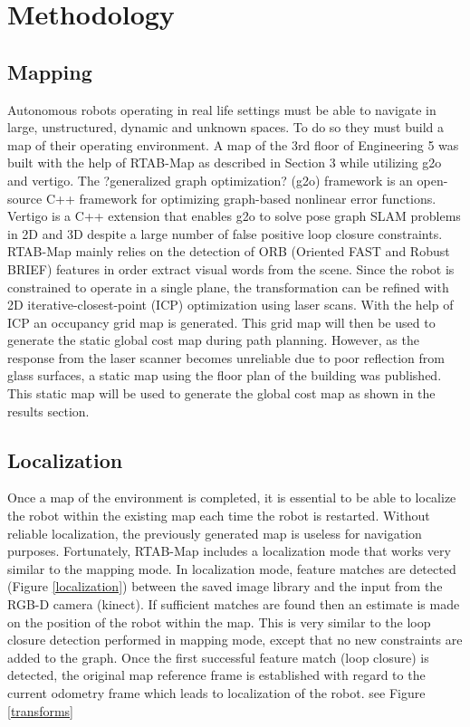 \documentclass[letterpaper, 10 pt, conference]{ieeeconf}  %
\begin{document}
\section{Methodology}

\subsection{Mapping}

Autonomous robots operating in real life settings must be able to navigate in large, unstructured, dynamic and unknown spaces. To do so they must build a map of their operating environment. A map of the 3rd floor of Engineering 5 was built with the help of RTAB-Map as described in Section 3 while utilizing g2o and vertigo. The ?generalized graph optimization? (g2o) framework is an open-source C++ framework for optimizing graph-based nonlinear error functions. Vertigo is a C++ extension that enables g2o to solve pose graph SLAM problems in 2D and 3D despite a large number of false positive loop closure constraints. RTAB-Map mainly relies on the detection of ORB (Oriented FAST and Robust BRIEF) features in order extract visual words from the scene. Since the robot is constrained to operate in a single plane, the transformation can be refined with 2D iterative-closest-point (ICP) optimization using laser scans. With the help of ICP an occupancy grid map is generated. This grid map will then be used to generate the static global cost map during path planning. However, as the response from the laser scanner becomes unreliable due to poor reflection from glass surfaces, a static map using the floor plan of the building was published. This static map will be used to generate the global cost map as shown in the results section.


\subsection{Localization}

Once a map of the environment is completed, it is essential to be able to localize the robot within the existing map each time the robot is restarted. Without reliable localization, the previously generated map is useless for navigation purposes. Fortunately, RTAB-Map includes a localization mode that works very similar to the mapping mode. In localization mode, feature matches are detected (Figure \ref{localization}) between the saved image library and the input from the RGB-D camera (kinect). If sufficient matches are found then an estimate is made on the position of the robot within the map. This is very similar to the loop closure detection performed in mapping mode, except that no new constraints are added to the graph. Once the first successful feature match (loop closure) is detected, the original map reference frame is established with regard to the current odometry frame which leads to localization of the robot. see Figure \ref{transforms}
\end{document}
